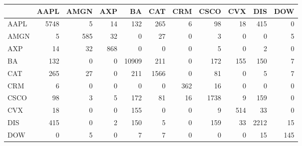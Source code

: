 \begin{tabular}{lrrrrrrrrrr}
\toprule
{} &  AAPL &  AMGN &  AXP &     BA &   CAT &  CRM &  CSCO &  CVX &   DIS &  DOW \\
\midrule
AAPL &  5748 &     5 &   14 &    132 &   265 &    6 &    98 &   18 &   415 &    0 \\
AMGN &     5 &   585 &   32 &      0 &    27 &    0 &     3 &    0 &     0 &    5 \\
AXP  &    14 &    32 &  868 &      0 &     0 &    0 &     5 &    0 &     2 &    0 \\
BA   &   132 &     0 &    0 &  10909 &   211 &    0 &   172 &  155 &   150 &    7 \\
CAT  &   265 &    27 &    0 &    211 &  1566 &    0 &    81 &    0 &     5 &    7 \\
CRM  &     6 &     0 &    0 &      0 &     0 &  362 &    16 &    0 &     0 &    0 \\
CSCO &    98 &     3 &    5 &    172 &    81 &   16 &  1738 &    9 &   159 &    0 \\
CVX  &    18 &     0 &    0 &    155 &     0 &    0 &     9 &  514 &    33 &    0 \\
DIS  &   415 &     0 &    2 &    150 &     5 &    0 &   159 &   33 &  2212 &   15 \\
DOW  &     0 &     5 &    0 &      7 &     7 &    0 &     0 &    0 &    15 &  145 \\
\bottomrule
\end{tabular}
